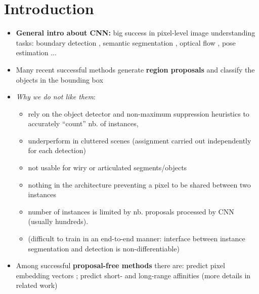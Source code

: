 
\section{Introduction}

\begin{itemize}
\item \textbf{General intro about CNN:} big success in pixel-level image understanding tasks: boundary detection \cite{arbelaez2011contour,xie2015holistically,maninis2018convolutional}, semantic segmentation \cite{long2015fully,chen2018deeplab,kong2018recurrent}, optical flow \cite{weinzaepfel2013deepflow,dosovitskiy2015flownet}, pose estimation \cite{wei2016convolutional,cao2017realtime}...
\item Many recent successful methods generate \textbf{region proposals} and classify the objects in the bounding box \cite{yang2012layered,ladicky2010and,hariharan2014simultaneous,chen2015multi,dai2016instance,liang2016reversible,he2017mask}
\item \emph{Why we do not like them}:
\begin{itemize}
\item rely on the object detector and non-maximum suppression heuristics to accurately “count” nb. of instances, 
\item underperform in cluttered scenes (assignment carried out independently for each detection) 
\item not usable for wiry or articulated segments/objects 
\item nothing in the architecture preventing a pixel to be shared between two instances
\item number of instances is limited by nb. proposals processed by CNN (usually hundreds). 
\item (difficult to train in an end-to-end manner: interface between instance segmentation and detection is non-differentiable)
\end{itemize}

\item Among successful \textbf{proposal-free methods} there are: predict pixel embedding vectors \cite{kong2018recurrent,fathi2017semantic,newell2017associative,de2017semantic}; predict short- and long-range affinities \cite{liu2018affinity,wolf2018mutex,xie2015holistically} (more details in related work)


\end{itemize}
